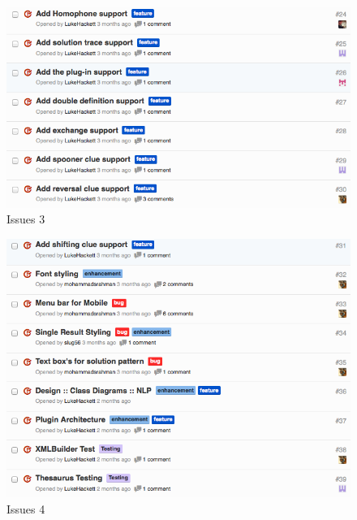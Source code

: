 \begin{figure}[H]
  \centering
  \includegraphics[width=\linewidth]{images/issues3.png}
  \caption{Issues 3}
  \label{fig:issues3}
\end{figure}

\begin{figure}[H]
  \centering
  \includegraphics[width=\linewidth]{images/issues4.png}
  \caption{Issues 4}
  \label{fig:issues4}
\end{figure}

